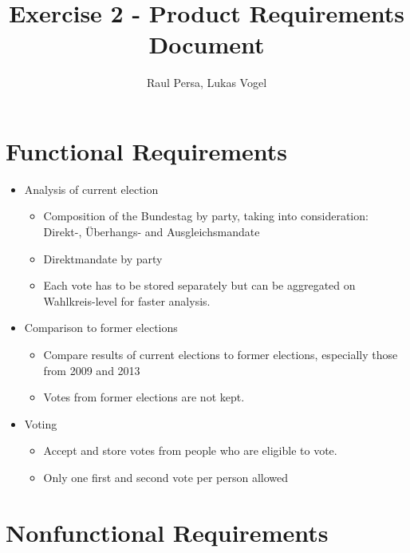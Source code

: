 \documentclass[10pt,a4paper]{article}
\author{Raul Persa, Lukas Vogel}
\title{Exercise 2 - Product Requirements Document}
\begin{document}
	\maketitle
	
	
	\section*{Functional Requirements}
	
	\begin{itemize}
		\item Analysis of current election
			\begin{itemize}
				\item Composition of the Bundestag by party, taking into consideration: Direkt-, \"Uberhangs- and Ausgleichsmandate
				\item Direktmandate by party
				\item Each vote has to be stored separately but can be aggregated on Wahlkreis-level for faster analysis.
			\end{itemize}
		\item Comparison to former elections
			\begin{itemize}
				\item Compare results of current elections to former elections, especially those from 2009 and 2013
				\item Votes from former elections are not kept.
			\end{itemize}
		\item Voting
			\begin{itemize}
				\item Accept and store votes from people who are eligible to vote.
				\item Only one first and second vote per person allowed
			\end{itemize}
	\end{itemize}
	
	\section*{Nonfunctional Requirements}
	
\end{document}

